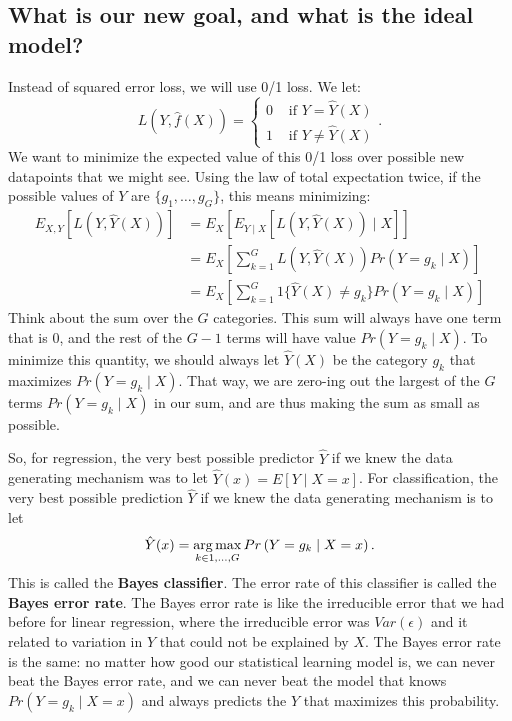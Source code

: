 \subsection{What is our new goal, and what is the ideal model?}

Instead of squared error loss, we will use 0/1 loss. We let: 
$$
L(Y, \hat{f}(X)) = \begin{cases}
 0 & \text { if } Y = \hat{Y}(X) \\
 1 & \text{ if } Y \neq \hat{Y}(X)	
 \end{cases}. 
$$
We want to minimize the expected value of this 0/1 loss over possible new datapoints that we might see. Using the law of total expectation twice, if the possible values of $Y$ are $\{g_1, \ldots, g_G\}$, this means minimizing: 
\begin{align*}
E_{X,Y} \left[ L(Y, \hat{Y}(X)) \right] &= E_{X} \left[ E_{Y \mid X} \left[ L(Y, \hat{Y}(X)) \mid X \right] \right] \\
&= E_X \left [ \sum_{k=1}^G L(Y, \hat{Y}(X)) Pr(Y=g_k \mid X) \right] \\
&= E_X \left [ \sum_{k=1}^G 1\{ \hat{Y}(X) \not= g_k \} Pr(Y=g_k \mid X) \right] 
\end{align*}
Think about the sum over the $G$ categories. This sum will always have one term that is $0$, and the rest of the $G-1$ terms will have value $Pr(Y=g_k \mid X)$. To minimize this quantity, we should always let $\hat{Y}(X)$ be the category $g_k$ that maximizes $Pr(Y=g_k \mid X)$. That way, we are zero-ing out the largest of the $G$ terms $Pr(Y=g_k \mid X)$ in our sum, and are thus making the sum as small as possible. 

So, for regression, the very best possible predictor $\hat{Y}$ if we knew the data generating mechanism was to let $\hat{Y}(x) = E[Y \mid X=x]$. For classification, the very best possible prediction $\hat{Y}$ if we knew the data generating mechanism is to let 
$$
\hat{Y}(x) = \mathop{\mathrm{arg\,max}}_{k \in 1,\ldots, G } Pr\left( Y = g_k \mid X=x \right). 
$$ 
This is called the \textbf{Bayes classifier}. The error rate of this classifier is called the \textbf{Bayes error rate}. The Bayes error rate is like the irreducible error that we had before for linear regression, where the irreducible error was $Var(\epsilon)$ and it related to variation in $Y$ that could not be explained by $X$. The Bayes error rate is the same: no matter how good our statistical learning model is, we can never beat the Bayes error rate, and we can never beat the model that knows $Pr\left( Y = g_k \mid X=x \right)$ and always predicts the $Y$ that maximizes this probability. 

